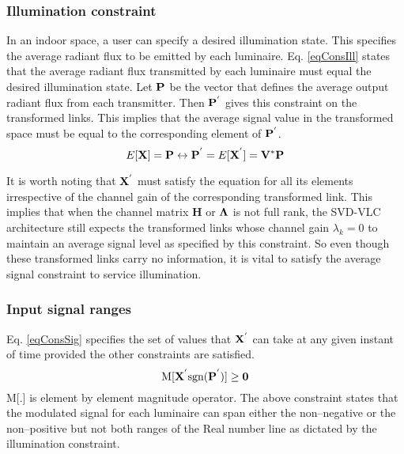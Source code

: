 \subsubsection{Illumination constraint}
\label{subsubsec:svdvlcSystemIllumination}

In an indoor space, a user can specify a desired illumination state. This specifies the average radiant flux to be emitted by each luminaire. Eq. \eqref{eqConsIll} states that the average radiant flux transmitted by each luminaire must equal the desired illumination state. Let ${\bf{P}}$ be the vector that defines the average output radiant flux from each transmitter. Then ${\bf{P}}^{'}$ gives this constraint on the transformed links. This implies that the average signal value in the transformed space must be equal to the corresponding element of ${\bf{P}}^{'}$. 
\begin{equation}
	\label{eqConsIll}
	E[{\bf{X}}] = {\bf{P}} \leftrightarrow {\bf{P}}^{'} = E[{\bf{X}}^{'}] = {\bf{V}}^{*}{\bf{P}}
\end{equation}

It is worth noting that ${\bf{X}}^{'}$ must satisfy the equation for all its elements irrespective of the channel gain of the corresponding transformed link. This implies that when the channel matrix {\bf{H}} or ${\bf{\Lambda}}$ is not full rank, the SVD-VLC architecture still expects the transformed links whose channel gain $\lambda_{k} = 0$ to maintain an average signal level as specified by this constraint. So even though these transformed links carry no information, it is vital to satisfy the average signal constraint to service illumination.

\subsubsection{Input signal ranges}
\label{subsubsec:svdvlcSystemRange}

Eq. \eqref{eqConsSig} specifies the set of values that ${\bf{X}}^{'}$ can take at any given instant of time provided the other constraints are satisfied.
	\begin{equation}
	\label{eqConsSig}
	\text{M}[{\bf{X}}^{'}\text{sgn}({\bf{P}}^{'})] \geq {\bf{0}}
\end{equation}
M[.] is element by element magnitude operator. The above constraint states that the modulated signal for each luminaire can span either the non--negative or the non--positive but not both ranges of the Real number line as dictated by the illumination constraint.

